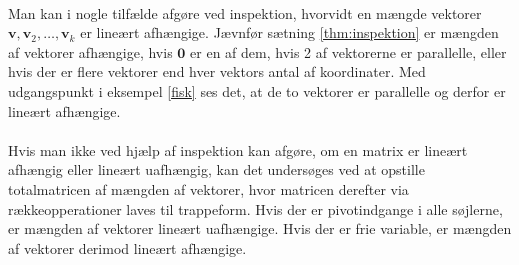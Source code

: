 \\
%
%
Man kan i nogle tilfælde afgøre ved inspektion, hvorvidt en mængde vektorer $\mathbf{v},\mathbf{v}_2,\ldots ,\mathbf{v}_k$ er lineært afhængige. 
Jævnfør sætning \ref{thm:inspektion} er mængden af vektorer afhængige, hvis $\mathbf{0}$ er en af dem, hvis 2 af vektorerne er parallelle, eller hvis der er flere vektorer end hver vektors antal af koordinater. 
Med udgangspunkt i eksempel \ref{fisk} ses det, at de to vektorer er parallelle og derfor er lineært afhængige. 
\\\\
Hvis man ikke ved hjælp af inspektion kan afgøre, om en matrix er lineært afhængig eller lineært uafhængig, kan det undersøges ved at opstille totalmatricen af mængden af vektorer, hvor matricen derefter via rækkeopperationer laves til trappeform. 
Hvis der er pivotindgange i alle søjlerne, er mængden af vektorer lineært uafhængige. Hvis der er frie variable, er mængden af vektorer derimod lineært afhængige.
\\\\
%
